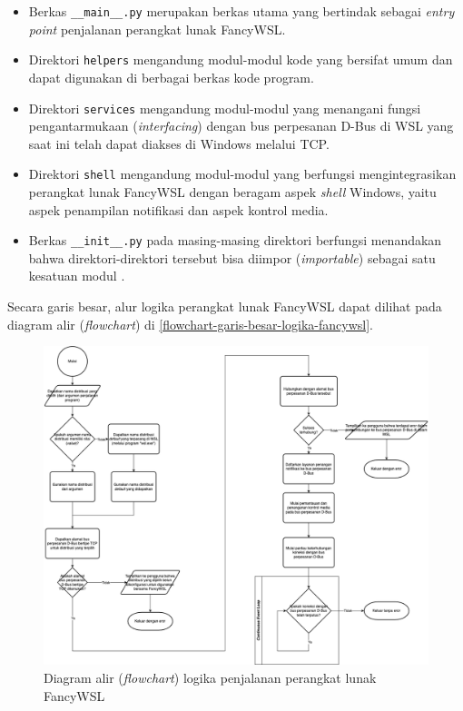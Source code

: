 \begin{itemize}
    \item Berkas \verb|__main__.py| merupakan berkas utama yang bertindak sebagai \textit{entry point} penjalanan perangkat lunak FancyWSL.

    \item Direktori \verb|helpers| mengandung modul-modul kode yang bersifat umum dan dapat digunakan di berbagai berkas kode program.

    \item Direktori \verb|services| mengandung modul-modul yang menangani fungsi pengantarmukaan (\textit{interfacing}) dengan bus perpesanan D-Bus di WSL yang saat ini telah dapat diakses di Windows melalui TCP.

    \item Direktori \verb|shell| mengandung modul-modul yang berfungsi mengintegrasikan perangkat lunak FancyWSL dengan beragam aspek \textit{shell} Windows, yaitu aspek penampilan notifikasi dan aspek kontrol media.

    \item Berkas \verb|__init__.py| pada masing-masing direktori berfungsi menandakan bahwa direktori-direktori tersebut bisa diimpor (\textit{importable}) sebagai satu kesatuan modul \cite{oliphant2007python}.
\end{itemize}

Secara garis besar, alur logika perangkat lunak FancyWSL dapat dilihat pada diagram alir (\textit{flowchart}) di \autoref{flowchart-garis-besar-logika-fancywsl}.

\begin{figure}
    \centering
    \includegraphics[width=1\linewidth]{assets/diagram-untuk-pendadaran-Page-2.drawio.png}
    \caption{Diagram alir (\textit{flowchart}) logika penjalanan perangkat lunak FancyWSL}
    \label{flowchart-garis-besar-logika-fancywsl}
\end{figure}

